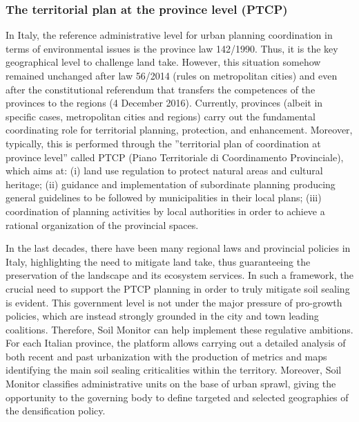 \documentclass[APA,LATO1COL,doublespace]{WileyNJD-v2}
\newcommand{\toberevised}[1]{\emph{\textcolor{red}{#1}}} %
\begin{document}
\subsubsection{The territorial plan at the province level (PTCP)} %
\label{sec:casePROV}
In Italy, the reference administrative level for urban planning coordination in terms of environmental issues is the province law 142/1990. 
Thus, it is the key geographical level to challenge land take. 
However, this situation somehow remained unchanged after law 56/2014 (rules on metropolitan cities) and even after the constitutional referendum that transfers the competences of the provinces to the regions (4 December 2016).
Currently, provinces (albeit in specific cases, metropolitan cities and regions) carry out the fundamental coordinating role for territorial planning, protection, and enhancement. 
Moreover, typically, this is performed through the ''territorial plan of coordination at province level'' called PTCP (Piano Territoriale di Coordinamento Provinciale), which aims at: (i) land use regulation to protect natural areas and cultural heritage; (ii) guidance and implementation of subordinate planning producing general guidelines to be followed by municipalities in their local plans; (iii) coordination of planning activities by local authorities in order to achieve a rational organization of the provincial spaces.

In the last decades, there have been many regional laws and provincial policies in Italy, highlighting the need to mitigate land take, thus guaranteeing the preservation of the landscape and its ecosystem services. 
In such a framework, the crucial need to support the PTCP planning in order to truly mitigate soil sealing is evident. 
This government level is not under the major pressure of pro-growth policies, which are instead strongly grounded in the city and town leading coalitions.
Therefore, Soil Monitor can help implement these regulative ambitions.
For each Italian province, the platform allows carrying out a detailed analysis of both recent and past urbanization with the production of metrics and maps identifying the main soil sealing criticalities within the territory.
Moreover, Soil Monitor classifies administrative units on the base of urban sprawl, giving the opportunity to the governing body to define targeted and selected geographies of the densification policy.
\end{document}
